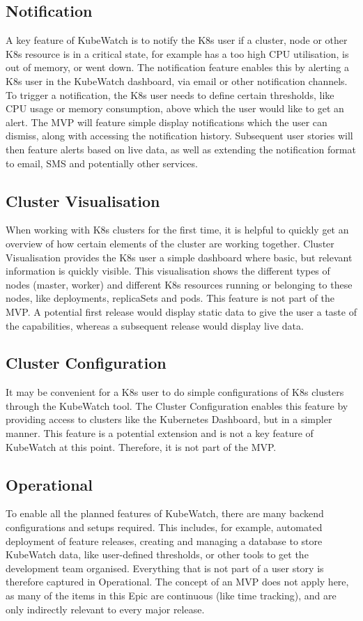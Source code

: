 \subsection{Notification}
A key feature of KubeWatch is to notify the K8s user if a cluster, node or other K8s resource is in a critical state, for example has a too high CPU utilisation, is out of memory, or went down. The notification feature enables this by alerting a K8s user in the KubeWatch dashboard, via email or other notification channels. To trigger a notification, the K8s user needs to define certain thresholds, like CPU usage or memory consumption, above which the user would like to get an alert. The MVP will feature simple display notifications which the user can dismiss, along with accessing the notification history. Subsequent user stories will then feature alerts based on live data, as well as extending the notification format to email, SMS and potentially other services.

\subsection{Cluster Visualisation}
When working with K8s clusters for the first time, it is helpful to quickly get an overview of how certain elements of the cluster are working together. Cluster Visualisation provides the K8s user a simple dashboard where basic, but relevant information is quickly visible. This visualisation shows the different types of nodes (master, worker) and different K8s resources running or belonging to these nodes, like deployments, replicaSets and pods. This feature is not part of the MVP. A potential first release would display static data to give the user a taste of the capabilities, whereas a subsequent release would display live data. 

\subsection{Cluster Configuration}
It may be convenient for a K8s user to do simple configurations of K8s clusters through the KubeWatch tool. The Cluster Configuration enables this feature by providing access to clusters like the Kubernetes Dashboard, but in a simpler manner. This feature is a potential extension and is not a key feature of KubeWatch at this point. Therefore, it is not part of the MVP.

\subsection{Operational}
To enable all the planned features of KubeWatch, there are many backend configurations and setups required. This includes, for example, automated deployment of feature releases, creating and managing a database to store KubeWatch data, like user-defined thresholds, or other tools to get the development team organised. Everything that is not part of a user story is therefore captured in Operational. The concept of an MVP does not apply here, as many of the items in this Epic are continuous (like time tracking), and are only indirectly relevant to every major release.

